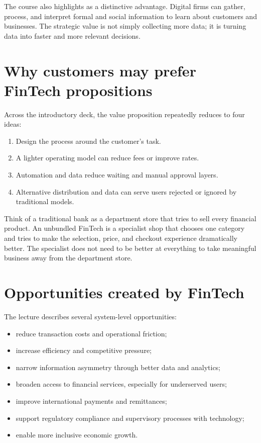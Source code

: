 The course also highlights  as a distinctive advantage. Digital firms can gather, process, and interpret formal and social information to learn about customers and businesses. The strategic value is not simply collecting more data; it is turning data into faster and more relevant decisions.

\section{Why customers may prefer FinTech propositions}

Across the introductory deck, the value proposition repeatedly reduces to four ideas:

\begin{enumerate}
  \item {} Design the process around the customer's task.
  \item {} A lighter operating model can reduce fees or improve rates.
  \item {} Automation and data reduce waiting and manual approval layers.
  \item {} Alternative distribution and data can serve users rejected or ignored by traditional models.
\end{enumerate}

\begin{analogy}
Think of a traditional bank as a department store that tries to sell every financial product. An unbundled FinTech is a specialist shop that chooses one category and tries to make the selection, price, and checkout experience dramatically better. The specialist does not need to be better at everything to take meaningful business away from the department store.
\end{analogy}

\section{Opportunities created by FinTech}

The lecture describes several system-level opportunities:

\begin{itemize}
  \item reduce transaction costs and operational friction;
  \item increase efficiency and competitive pressure;
  \item narrow information asymmetry through better data and analytics;
  \item broaden access to financial services, especially for underserved users;
  \item improve international payments and remittances;
  \item support regulatory compliance and supervisory processes with technology;
  \item enable more inclusive economic growth.
\end{itemize}

